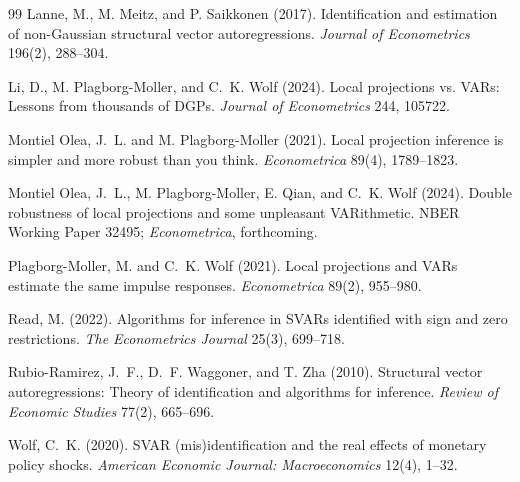\documentclass[11pt]{article}
\theoremstyle{definition}
\theoremstyle{plain}
\theoremstyle{remark}
\begin{document}
\begin{thebibliography}{99}
Lanne, M., M. Meitz, and P. Saikkonen (2017).
Identification and estimation of non-Gaussian structural vector autoregressions.
\emph{Journal of Econometrics} 196(2), 288--304.

Li, D., M. Plagborg-Moller, and C.~K. Wolf (2024).
Local projections vs. VARs: Lessons from thousands of DGPs.
\emph{Journal of Econometrics} 244, 105722.

Montiel Olea, J.~L. and M. Plagborg-Moller (2021).
Local projection inference is simpler and more robust than you think.
\emph{Econometrica} 89(4), 1789--1823.

Montiel Olea, J.~L., M. Plagborg-Moller, E. Qian, and C.~K. Wolf (2024).
Double robustness of local projections and some unpleasant VARithmetic.
NBER Working Paper 32495; \emph{Econometrica}, forthcoming.

Plagborg-Moller, M. and C.~K. Wolf (2021).
Local projections and VARs estimate the same impulse responses.
\emph{Econometrica} 89(2), 955--980.

Read, M. (2022).
Algorithms for inference in SVARs identified with sign and zero restrictions.
\emph{The Econometrics Journal} 25(3), 699--718.

Rubio-Ramirez, J.~F., D.~F. Waggoner, and T. Zha (2010).
Structural vector autoregressions: Theory of identification and algorithms for inference.
\emph{Review of Economic Studies} 77(2), 665--696.

Wolf, C.~K. (2020).
SVAR (mis)identification and the real effects of monetary policy shocks.
\emph{American Economic Journal: Macroeconomics} 12(4), 1--32.
\end{thebibliography}
\end{document}
